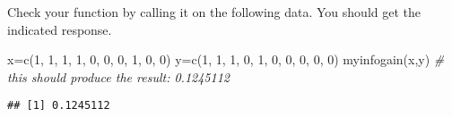 \documentclass[
]{article}
\newenvironment{Shaded}{\begin{snugshade}}{\end{snugshade}}
\newcommand{\CommentTok}[1]{\textcolor[rgb]{0.56,0.35,0.01}{\textit{#1}}}
\newcommand{\DecValTok}[1]{\textcolor[rgb]{0.00,0.00,0.81}{#1}}
\newcommand{\FunctionTok}[1]{\textcolor[rgb]{0.00,0.00,0.00}{#1}}
\newcommand{\NormalTok}[1]{#1}
\newcommand{\OtherTok}[1]{\textcolor[rgb]{0.56,0.35,0.01}{#1}}
\begin{document}
Check your function by calling it on the following data. You should get
the indicated response.

\begin{Shaded}
\begin{Highlighting}[]
\NormalTok{x}\OtherTok{=}\FunctionTok{c}\NormalTok{(}\DecValTok{1}\NormalTok{, }\DecValTok{1}\NormalTok{, }\DecValTok{1}\NormalTok{, }\DecValTok{1}\NormalTok{, }\DecValTok{0}\NormalTok{, }\DecValTok{0}\NormalTok{, }\DecValTok{0}\NormalTok{, }\DecValTok{1}\NormalTok{, }\DecValTok{0}\NormalTok{, }\DecValTok{0}\NormalTok{)}
\NormalTok{y}\OtherTok{=}\FunctionTok{c}\NormalTok{(}\DecValTok{1}\NormalTok{, }\DecValTok{1}\NormalTok{, }\DecValTok{1}\NormalTok{, }\DecValTok{0}\NormalTok{, }\DecValTok{1}\NormalTok{, }\DecValTok{0}\NormalTok{, }\DecValTok{0}\NormalTok{, }\DecValTok{0}\NormalTok{, }\DecValTok{0}\NormalTok{, }\DecValTok{0}\NormalTok{)}
\FunctionTok{myinfogain}\NormalTok{(x,y) }\CommentTok{\# this should produce the result: 0.1245112}
\end{Highlighting}
\end{Shaded}

\begin{verbatim}
## [1] 0.1245112
\end{verbatim}
\end{document}
